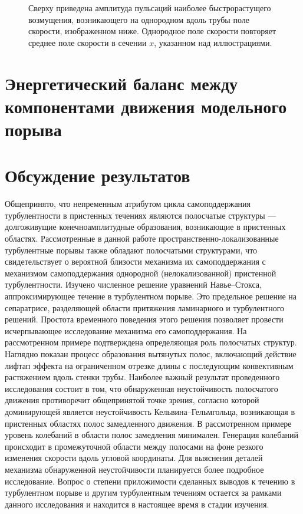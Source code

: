  
\begin{figure}[h]
\caption{Сверху приведена амплитуда пульсаций наиболее быстрорастущего возмущения, возникающего на однородном вдоль трубы поле скорости, изображенном ниже. Однородное поле скорости повторяет среднее поле скорости в сечении $x$, указанном над иллюстрациями.}
\label{cs_lin_map_pic}
\end{figure}

\section{Энергетический баланс между компонентами движения модельного порыва}



\section{Обсуждение результатов}

Общепринято, что непременным атрибутом цикла самоподдержания турбулентности в пристенных течениях являются полосчатые структуры --- долгоживущие конечноамплитудные образования, возникающие в пристенных областях. Рассмотренные в данной работе пространственно-локализованные турбулентные порывы также обладают полосчатыми структурами, что свидетельствует о вероятной близости механизма их самоподдержания с механизмом самоподдержания однородной (нелокализованной) пристенной турбулентности. Изучено численное решение уравнений Навье--Стокса, аппроксимирующее течение в турбулентном порыве. Это предельное решение на сепаратрисе, разделяющей области притяжения ламинарного и турбулентного решений. Простота временного поведения этого решения позволяет провести исчерпывающее исследование механизма его самоподдержания. На рассмотренном примере подтверждена определяющая роль полосчатых структур. Наглядно показан процесс образования вытянутых полос, включающий действие лифтап  эффекта на ограниченном отрезке длины с последующим конвективным растяжением вдоль стенки трубы. Наиболее важный результат проведенного исследования состоит в том, что обнаруженная неустойчивость полосчатого движения противоречит общепринятой точке зрения, согласно которой доминирующей является неустойчивость Кельвина--Гельмгольца, возникающая в пристенных областях полос замедленного движения. В рассмотренном примере уровень колебаний в области полос замедления минимален. Генерация колебаний происходит в промежуточной области между полосами на фоне резкого изменения скорости вдоль угловой координаты. Для выяснения деталей механизма обнаруженной неустойчивости планируется более подробное исследование. Вопрос о степени приложимости сделанных выводов к течению в турбулентном порыве и другим турбулентным течениям остается за рамками данного исследования и находится в настоящее время в стадии изучения.


